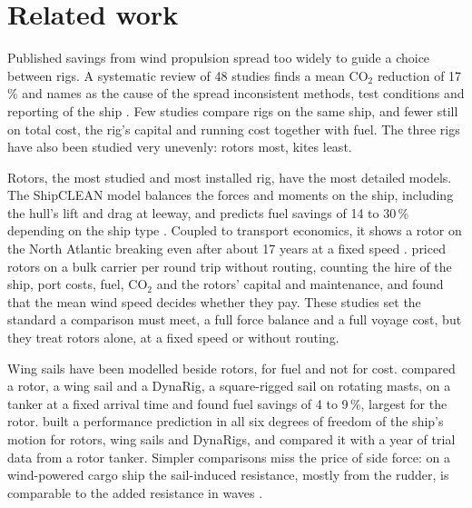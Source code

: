 \section{Related work}
\label{sec:related}

Published savings from wind propulsion spread too widely to guide a choice between rigs. A systematic review of 48 studies finds a mean CO$_2$ reduction of 17\,\% and names as the cause of the spread inconsistent methods, test conditions and reporting of the ship \citep{huang2025}. Few studies compare rigs on the same ship, and fewer still on total cost, the rig's capital and running cost together with fuel. The three rigs have also been studied very unevenly: rotors most, kites least.

Rotors, the most studied and most installed rig, have the most detailed models. The ShipCLEAN model balances the forces and moments on the ship, including the hull's lift and drag at leeway, and predicts fuel savings of 14 to 30\,\% depending on the ship type \citep{tillig2020}. Coupled to transport economics, it shows a rotor on the North Atlantic breaking even after about 17 years at a fixed speed \citep{tillig2020b}. \citet{hansen2025} priced rotors on a bulk carrier per round trip without routing, counting the hire of the ship, port costs, fuel, CO$_2$ and the rotors' capital and maintenance, and found that the mean wind speed decides whether they pay. These studies set the standard a comparison must meet, a full force balance and a full voyage cost, but they treat rotors alone, at a fixed speed or without routing.

Wing sails have been modelled beside rotors, for fuel and not for cost. \citet{lu2020} compared a rotor, a wing sail and a DynaRig, a square-rigged sail on rotating masts, on a tanker at a fixed arrival time and found fuel savings of 4 to 9\,\%, largest for the rotor. \citet{rechevilanova2021} built a performance prediction in all six degrees of freedom of the ship's motion for rotors, wing sails and DynaRigs, and compared it with a year of trial data from a rotor tanker. Simpler comparisons miss the price of side force: on a wind-powered cargo ship the sail-induced resistance, mostly from the rudder, is comparable to the added resistance in waves \citep{kramer2022}.

